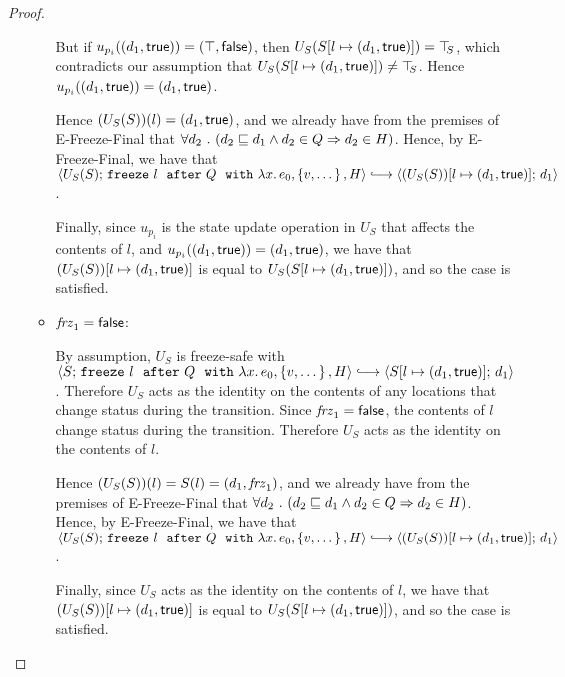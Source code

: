 \begin{proof}
\begin{itemize}
\begin{itemize}
          But if $u_{p_i}((d_1, \textsf{true})) =
          (\top, \textsf{false})$, then
          $U_S(S[l \mapsto (d_1, \textsf{true})]) = \top\hspace{-0.85mm}_{S}$, which
          contradicts our assumption that
          $U_S(S[l \mapsto (d_1, \textsf{true})]) \neq \top\hspace{-0.85mm}_{S}$.  Hence
          $u_{p_i}((d_1, \textsf{true})) =
          (d_1, \textsf{true})$.

          Hence $(U_S(S))(l) = (d_1, \textsf{true})$, and we
          already have from the premises of {\sc E-Freeze-Final} that
          $\forall{d_2} ~.~ ( {d_2 \sqsubseteq d_1 \land d_2 \in Q}
          \Rightarrow d_2 \in H)$.  Hence, by {\sc E-Freeze-Final}, we
          have that
          $\config{U_S(S)}{\freezeafterfull{l}{Q}{\lam{x}{e_0}}{\setof{v,
                \dots}}{H}} \parstepsto
          \config{\extS{(U_S(S))}{l}{d_1}{\frozentrue}}{d_1}$.

          Finally, since $u_{p_i}$ is the state update operation in
          $U_S$ that affects the contents of $l$, and
          $u_{p_i}((d_1, \textsf{true})) =
          (d_1, \textsf{true})$, we have that
          $(U_S(S))[l \mapsto (d_1, \textsf{true})]$ is equal to
          $U_S(S[l \mapsto (d_1, \textsf{true})])$, and so the case is
          satisfied.

        \item $\mathit{frz}_1 = \textsf{false}$:

          By assumption, $U_S$ is freeze-safe with
          $\config{S}{\freezeafterfull{l}{Q}{\lam{x}{e_0}}{\setof{v,
                \dots}}{H}} \parstepsto
          \config{\extS{S}{l}{d_1}{\frozentrue}}{d_1}$.  Therefore
          $U_S$ acts as the identity on the contents of any locations
          that change status during the transition.  Since $\mathit{frz}_1
          = \textsf{false}$, the contents of $l$ change status during
          the transition.  Therefore $U_S$ acts as the identity on the
          contents of $l$.

          Hence $(U_S(S))(l) = S(l) = (d_1, \mathit{frz}_1)$, and we
          already have from the premises of {\sc E-Freeze-Final} that
          $\forall{d_2} ~.~ ( {d_2 \sqsubseteq d_1 \land d_2 \in Q}
          \Rightarrow d_2 \in H)$.  Hence, by {\sc E-Freeze-Final}, we
          have that
          $\config{U_S(S)}{\freezeafterfull{l}{Q}{\lam{x}{e_0}}{\setof{v,
                \dots}}{H}} \parstepsto
          \config{\extS{(U_S(S))}{l}{d_1}{\frozentrue}}{d_1}$.

          Finally, since $U_S$ acts as the identity on the contents of
          $l$, we have that $(U_S(S))[l \mapsto (d_1, \textsf{true})]$ is
          equal to $U_S(S[l \mapsto (d_1, \textsf{true})])$, and so the
          case is satisfied.
      \end{itemize}


\end{itemize}
\end{proof}
